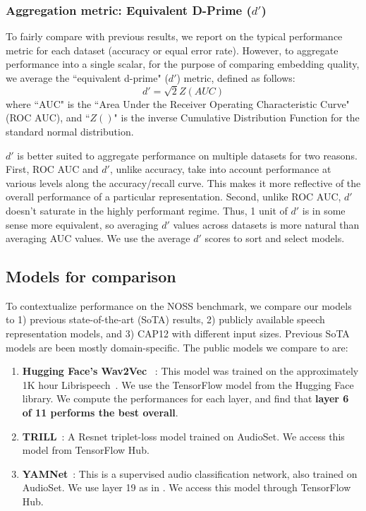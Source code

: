 %
\vspace{-2mm}
\subsubsection{Aggregation metric: Equivalent D-Prime ($d'$)}
\label{subsubsec:dprime}
To fairly compare with previous results, we report on the typical performance metric for each dataset (accuracy or equal error rate). However, to aggregate performance into a single scalar, for the purpose of comparing embedding quality, we average the ``equivalent d-prime" ($d'$) metric, defined as follows: 
\begin{equation}
    d' = \sqrt{2}Z(AUC)
\end{equation}
where ``AUC" is the ``Area Under the Receiver Operating Characteristic Curve" (ROC AUC), and ``$Z()$" is the inverse Cumulative Distribution Function for the standard normal distribution.

$d'$ is better suited to aggregate performance on multiple datasets for two reasons. First, ROC AUC and $d'$, unlike accuracy, take into account performance at various levels along the accuracy/recall curve. This makes it more reflective of the overall performance of a particular representation. Second, unlike ROC AUC, $d'$ doesn't saturate in the highly performant regime. Thus, 1 unit of $d'$ is in some sense more equivalent, so averaging $d'$ values across datasets is more natural than averaging AUC values. We use the average $d'$ scores to sort and select models.

\subsection{Models for comparison}
\label{subsubsec:baselines}
To contextualize performance on the NOSS benchmark, we compare our models to 1) previous state-of-the-art (SoTA) results, 2) publicly available speech representation models, and 3) CAP12 with different input sizes. Previous SoTA models are been mostly domain-specific. The public models we compare to are:

\begin{enumerate}\itemsep0em
    \item \textbf{Hugging Face's Wav2Vec }~\cite{baevski2020wav2vec,transformers_lib}: This model was trained on the approximately 1K hour Librispeech~\cite{librispeech}. We use the TensorFlow model from the Hugging Face library. We compute the performances for each layer, and find that \textbf{layer 6 of 11 performs the best overall}.
    \item \textbf{TRILL}~\cite{trill}: A Resnet triplet-loss model trained on AudioSet. We access this model from TensorFlow Hub.
    \item \textbf{YAMNet}~\cite{hershey2017cnn}: This is a supervised audio classification network, also trained on AudioSet. We use layer 19 as in \cite{trill}. We access this model through TensorFlow Hub.
\end{enumerate}

